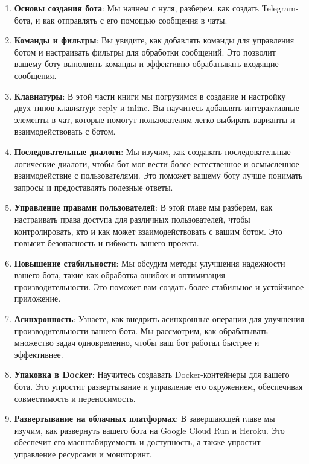 \documentclass[
]{book}
\providecommand{\tightlist}{%
  \setlength{\itemsep}{0pt}\setlength{\parskip}{0pt}}
\begin{document}
\begin{enumerate}
\def\labelenumi{\arabic{enumi}.}
\tightlist
\item
  \textbf{Основы создания бота}: Мы начнем с нуля, разберем, как создать Telegram-бота, и как отправлять с его помощью сообщения в чаты.
\item
  \textbf{Команды и фильтры}: Вы увидите, как добавлять команды для управления ботом и настраивать фильтры для обработки сообщений. Это позволит вашему боту выполнять команды и эффективно обрабатывать входящие сообщения.
\item
  \textbf{Клавиатуры}: В этой части книги мы погрузимся в создание и настройку двух типов клавиатур: reply и inline. Вы научитесь добавлять интерактивные элементы в чат, которые помогут пользователям легко выбирать варианты и взаимодействовать с ботом.
\item
  \textbf{Последовательные диалоги}: Мы изучим, как создавать последовательные логические диалоги, чтобы бот мог вести более естественное и осмысленное взаимодействие с пользователями. Это поможет вашему боту лучше понимать запросы и предоставлять полезные ответы.
\item
  \textbf{Управление правами пользователей}: В этой главе мы разберем, как настраивать права доступа для различных пользователей, чтобы контролировать, кто и как может взаимодействовать с вашим ботом. Это повысит безопасность и гибкость вашего проекта.
\item
  \textbf{Повышение стабильности}: Мы обсудим методы улучшения надежности вашего бота, такие как обработка ошибок и оптимизация производительности. Это поможет вам создать более стабильное и устойчивое приложение.
\item
  \textbf{Асинхронность}: Узнаете, как внедрить асинхронные операции для улучшения производительности вашего бота. Мы рассмотрим, как обрабатывать множество задач одновременно, чтобы ваш бот работал быстрее и эффективнее.
\item
  \textbf{Упаковка в Docker}: Научитесь создавать Docker-контейнеры для вашего бота. Это упростит развертывание и управление его окружением, обеспечивая совместимость и переносимость.
\item
  \textbf{Развертывание на облачных платформах}: В завершающей главе мы изучим, как развернуть вашего бота на Google Cloud Run и Heroku. Это обеспечит его масштабируемость и доступность, а также упростит управление ресурсами и мониторинг.
\end{enumerate}
\end{document}
